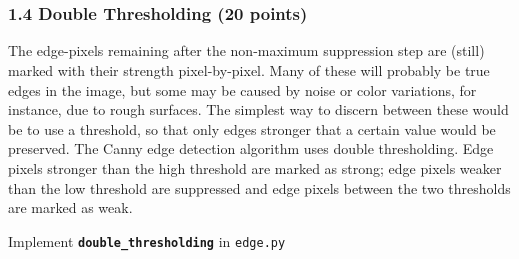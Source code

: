 \documentclass[11pt]{article}
\begin{document}
    \begin{center}
    \end{center}
    { \hspace*{\fill} \\}
    
    \begin{center}
    \end{center}
    { \hspace*{\fill} \\}
    
    \subsubsection{1.4 Double Thresholding (20
points)}\label{double-thresholding-20-points}

The edge-pixels remaining after the non-maximum suppression step are
(still) marked with their strength pixel-by-pixel. Many of these will
probably be true edges in the image, but some may be caused by noise or
color variations, for instance, due to rough surfaces. The simplest way
to discern between these would be to use a threshold, so that only edges
stronger that a certain value would be preserved. The Canny edge
detection algorithm uses double thresholding. Edge pixels stronger than
the high threshold are marked as strong; edge pixels weaker than the low
threshold are suppressed and edge pixels between the two thresholds are
marked as weak.

Implement \textbf{\texttt{double\_thresholding}} in \texttt{edge.py}
\end{document}
